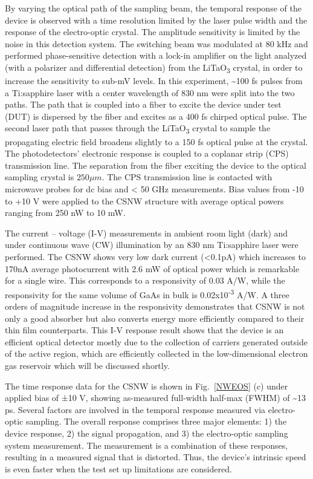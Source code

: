 By varying the optical path of the sampling beam, the temporal response of the
device is observed with a time resolution limited by the laser pulse width and
the response of the electro-optic crystal. The amplitude sensitivity is limited
by the noise in this detection system. The switching beam was modulated at 80
kHz and performed phase-sensitive detection with a lock-in amplifier on the
light analyzed (with a polarizer and differential detection) from the
LiTaO\textsubscript{3} crystal, in order to increase the sensitivity to sub-mV
levels. In this experiment, \textasciitilde{}100 fs pulses from a Ti:sapphire
laser with a center wavelength of 830 nm were split into the two paths. The
path that is coupled into a fiber to excite the device under test (DUT) is
dispersed by the fiber and excites as a 400 fs chirped optical pulse.  The
second laser path that passes through the LiTaO\textsubscript{3} crystal to
sample the propagating electric field broadens slightly to a 150 fs optical
pulse at the crystal. The photodetectors' electronic response is coupled to a
coplanar strip (CPS) transmission line. The separation from the fiber exciting
the device to the optical sampling crystal is $250 \mu{m}$. The CPS
transmission line is contacted with microwave probes for dc bias and
\textless{} 50 GHz measurements. Bias values from -10 to +10 V were applied to
the CSNW structure with average optical powers ranging from 250 nW to 10 mW.

The current -- voltage (I-V) measurements in ambient room light (dark) and
under continuous wave (CW) illumination by an 830 nm Ti:sapphire laser were
performed. The CSNW shows very low dark current (\textless{}0.1pA) which
increases to 170nA average photocurrent with 2.6 mW of optical power which is
remarkable for a single wire. This corresponds to a responsivity of 0.03 A/W,
while the responsivity for the same volume of GaAs in bulk is
0.02x10\textsuperscript{-3} A/W. A three orders of magnitude increase in the
responsivity demonstrates that CSNW is not only a good absorber but also
converts energy more efficiently compared to their thin film counterparts. This
I-V response result shows that the device is an efficient optical detector
mostly due to the collection of carriers generated outside of the active
region, which are efficiently collected in the low-dimensional electron gas
reservoir which will be discussed shortly.

The time response data for the CSNW is shown in Fig.~\ref{NWEOS} (c) under
applied bias of ±10 V, showing as-measured full-width half-max (FWHM) of
\textasciitilde{}13 ps. Several factors are involved in the temporal response
measured via electro-optic sampling. The overall response comprises three major
elements: 1) the device response, 2) the signal propagation, and 3) the
electro-optic sampling system measurement. The measurement is a combination of
these responses, resulting in a measured signal that is distorted. Thus, the
device's intrinsic speed is even faster when the test set up limitations are
considered.

